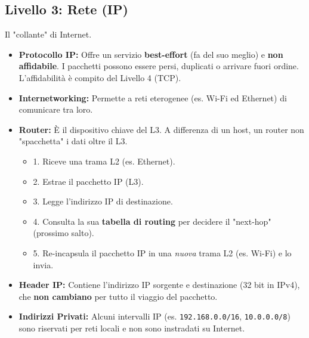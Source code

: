 \documentclass[../main.tex]{subfiles}
\begin{document}
\subsection{Livello 3: Rete (IP)}
Il "collante" di Internet.
\begin{itemize}
    \item \textbf{Protocollo IP:} Offre un servizio \textbf{best-effort} (fa del suo meglio) e \textbf{non affidabile}. I pacchetti possono essere persi, duplicati o arrivare fuori ordine. L'affidabilità è compito del Livello 4 (TCP).
    \item \textbf{Internetworking:} Permette a reti eterogenee (es. Wi-Fi ed Ethernet) di comunicare tra loro.
    \item \textbf{Router:} È il dispositivo chiave del L3. A differenza di un host, un router non "spacchetta" i dati oltre il L3.
    \begin{itemize}
        \item 1. Riceve una trama L2 (es. Ethernet).
        \item 2. Estrae il pacchetto IP (L3).
        \item 3. Legge l'indirizzo IP di destinazione.
        \item 4. Consulta la sua \textbf{tabella di routing} per decidere il "next-hop" (prossimo salto).
        \item 5. Re-incapsula il pacchetto IP in una \emph{nuova} trama L2 (es. Wi-Fi) e lo invia.
    \end{itemize}
    \item \textbf{Header IP:} Contiene l'indirizzo IP sorgente e destinazione (32 bit in IPv4), che \textbf{non cambiano} per tutto il viaggio del pacchetto.
    \item \textbf{Indirizzi Privati:} Alcuni intervalli IP (es. \texttt{192.168.0.0/16}, \texttt{10.0.0.0/8}) sono riservati per reti locali e non sono instradati su Internet.
\end{itemize}
\end{document}

